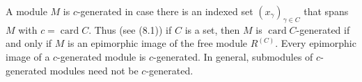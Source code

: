 A module $M$ is $c$-generated in case there is an indexed set $(x_\gamma)_{\gamma \in C}$ that spans $M$ with $c = \operatorname{card} C$. Thus (see (8.1)) if $C$ is a set, then $M$ is $\operatorname{card} C$-generated if and only if $M$ is an epimorphic image of the free module $R^{(C)}$. Every epimorphic image of a $c$-generated module is $c$-generated. In general, submodules of $c$-generated modules need not be $c$-generated.
